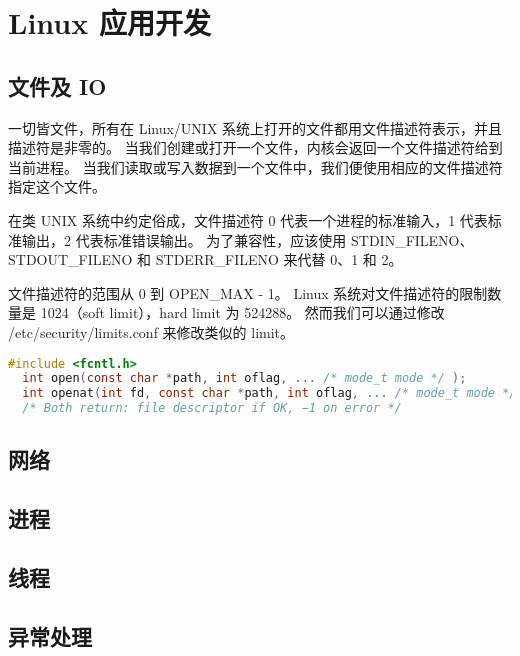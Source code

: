 \section{Linux 应用开发}

\subsection{文件及 IO}

一切皆文件，所有在 Linux/UNIX 系统上打开的文件都用文件描述符表示，并且描述符是非零的。
当我们创建或打开一个文件，内核会返回一个文件描述符给到当前进程。
当我们读取或写入数据到一个文件中，我们便使用相应的文件描述符指定这个文件。

在类 UNIX 系统中约定俗成，文件描述符 0 代表一个进程的标准输入，1 代表标准输出，2 代表标准错误输出。
为了兼容性，应该使用 STDIN\_FILENO、STDOUT\_FILENO 和 STDERR\_FILENO 来代替 0、1 和 2。

文件描述符的范围从 0 到 OPEN\_MAX - 1。
Linux 系统对文件描述符的限制数量是 1024（soft limit），hard limit 为 524288。
然而我们可以通过修改 /etc/security/limits.conf 来修改类似的 limit。


\begin{lstlisting}[language=C]
  #include <fcntl.h>
  int open(const char *path, int oflag, ... /* mode_t mode */ );
  int openat(int fd, const char *path, int oflag, ... /* mode_t mode */ );
  /* Both return: file descriptor if OK, −1 on error */
\end{lstlisting}

\subsection{网络}

\subsection{进程}

\subsection{线程}

\subsection{异常处理}
